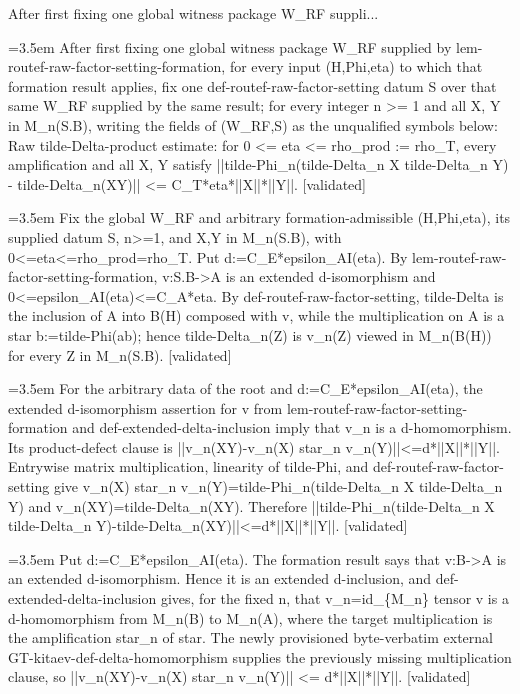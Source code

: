 \documentclass{article}
\newcommand{\step}[1]{\par\noindent\hangindent=3.5em\hangafter=1%
  \makebox[3.5em][l]{\textbf{#1.}}}
\newcommand{\steptag}[1]{\hfill{\small\textsf{[#1]}}}
\begin{document}
\begin{proofbox}{After first fixing one global witness package W\_RF suppli...}
\step{1} After first fixing one global witness package W\_RF supplied by lem-routef-raw-factor-setting-formation, for every input (H,Phi,eta) to which that formation result applies, fix one def-routef-raw-factor-setting datum S over that same W\_RF supplied by the same result; for every integer n >= 1 and all X, Y in M\_n(S.B), writing the fields of (W\_RF,S) as the unqualified symbols below: Raw tilde-Delta-product estimate: for 0 <= eta <= rho\_prod := rho\_T, every amplification and all X, Y satisfy ||tilde-Phi\_n(tilde-Delta\_n X tilde-Delta\_n Y) - tilde-Delta\_n(XY)|| <= C\_T*eta*||X||*||Y||. \steptag{validated} \\[6pt]
\step{1.1} Fix the global W\_RF and arbitrary formation-admissible (H,Phi,eta), its supplied datum S, n>=1, and X,Y in M\_n(S.B), with 0<=eta<=rho\_prod=rho\_T. Put d:=C\_E*epsilon\_AI(eta). By lem-routef-raw-factor-setting-formation, v:S.B->A is an extended d-isomorphism and 0<=epsilon\_AI(eta)<=C\_A*eta. By def-routef-raw-factor-setting, tilde-Delta is the inclusion of A into B(H) composed with v, while the multiplication on A is a star b:=tilde-Phi(ab); hence tilde-Delta\_n(Z) is v\_n(Z) viewed in M\_n(B(H)) for every Z in M\_n(S.B). \steptag{validated} \\[4pt]
\step{1.2} For the arbitrary data of the root and d:=C\_E*epsilon\_AI(eta), the extended d-isomorphism assertion for v from lem-routef-raw-factor-setting-formation and def-extended-delta-inclusion imply that v\_n is a d-homomorphism. Its product-defect clause is ||v\_n(XY)-v\_n(X) star\_n v\_n(Y)||<=d*||X||*||Y||. Entrywise matrix multiplication, linearity of tilde-Phi, and def-routef-raw-factor-setting give v\_n(X) star\_n v\_n(Y)=tilde-Phi\_n(tilde-Delta\_n X tilde-Delta\_n Y) and v\_n(XY)=tilde-Delta\_n(XY). Therefore ||tilde-Phi\_n(tilde-Delta\_n X tilde-Delta\_n Y)-tilde-Delta\_n(XY)||<=d*||X||*||Y||. \steptag{validated} \\[6pt]
\step{1.2.1} Put d:=C\_E*epsilon\_AI(eta). The formation result says that v:B->A is an extended d-isomorphism. Hence it is an extended d-inclusion, and def-extended-delta-inclusion gives, for the fixed n, that v\_n=id\_\{M\_n\} tensor v is a d-homomorphism from M\_n(B) to M\_n(A), where the target multiplication is the amplification star\_n of star. The newly provisioned byte-verbatim external GT-kitaev-def-delta-homomorphism supplies the previously missing multiplication clause, so ||v\_n(XY)-v\_n(X) star\_n v\_n(Y)|| <= d*||X||*||Y||. \steptag{validated} \\[4pt]

\end{proofbox}
\end{document}
